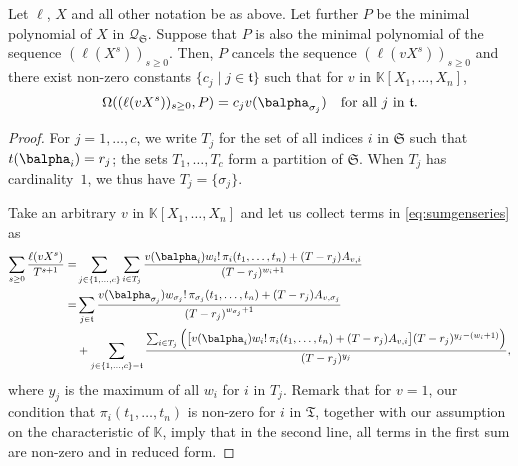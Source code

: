 \documentclass[12pt]{article}
\newcommand{\minpoly}{P}
\newcommand{\lf}{X}
\newcommand{\residueI}{\mathscr{Q}}
\def\K{\mathbb{K}}
\def\K {\ensuremath{\mathbb{K}}}
\begin{document}
\begin{lemma} \label{lemma:anyv}
  Let $\ell$, $\lf$ and all other notation be as above. Let further
  $\minpoly$ be the minimal polynomial of $\lf$ in
  $\residueI_\mathfrak{S}$. Suppose that $\minpoly$ is also the minimal
  polynomial of the sequence $(\ell(\lf^s))_{s \ge 0}$. Then, $\minpoly$
  cancels the sequence $(\ell(v \lf^s))_{s\ge0}$ and
there
  exist non-zero constants $\{c_j \mid j \in \mathfrak{t}\}$ such that
  for $v$ in $\K[X_1,\dots,X_n]$,
  $$\Omega((\ell(v \lf^s))_{s\ge0},\minpoly) = c_{j} v(\balpha_{\sigma_j}) \quad \text{for all $j$ in $\mathfrak{t}$.}$$
\end{lemma}
\begin{proof}
  For $j=1,\dots,c$, we write $T_j$ for the set of all indices $i$ in
  $\mathfrak{S}$ such that $t(\balpha_{i})=r_j$; the sets
  $T_1,\dots,T_c$ form a partition of $\mathfrak{S}$. When $T_j$ has
  cardinality~$1$, we thus have $T_j=\{\sigma_j\}$.
  
  Take an arbitrary $v$ in $\K[X_1,\dots,X_n]$ and let us
  collect terms in \cref{eq:sumgenseries} as
  \begin{align*}
    \sum_{s \ge 0} \frac{\ell(v \lf^s)}{T^{s+1}} =&
    \sum_{j \in \{1,\dots,c\}}
    \sum_{i \in T_j} \frac{
      v(\balpha_{i})   w_{i}!\, \pi_{i}(t_1,\dots,t_n)
      + (T-r_{j} )A_{v,i}}
	{(T-r_{j} )^{w_{i}+1}}\\
	=&
	\sum_{j \in \mathfrak{t}}
	\frac{
	  v(\balpha_{\sigma_{j}})  w_{\sigma_j}!\, \pi_{\sigma_j}(t_1,\dots,t_n)
	  + (T-r_{j}  )A_{v,\sigma_j} }
	     {(T-r_{j} )^{w_{\sigma_j}+1}}\\
	     &+
	     \sum_{j \in \{1,\dots,c\}-\mathfrak{t}}
	     \frac{   \sum_{i \in T_j} \Big( \big[
		 v(\balpha_{i})   w_{i}!\, \pi_{i}(t_1,\dots,t_n)
		 + (T-r_{j}  )A_{v,i} \big ]
	       (T-r_{j} )^{y_j-(w_i+1)}\Big)}
	          {(T-r_{j} )^{y_j}},
  \end{align*}
  where $y_j$ is the maximum of all $w_i$ for $i$ in $T_j$.  Remark
  that for $v=1$, our condition that $\pi_i(t_1,\dots,t_n)$ is
  non-zero for $i$ in $\mathfrak{T}$, together with our assumption on
  the characteristic of $\K$, imply that in the second line, all terms
  in the first sum are non-zero and in reduced form.
  

\end{proof}
\end{document}
